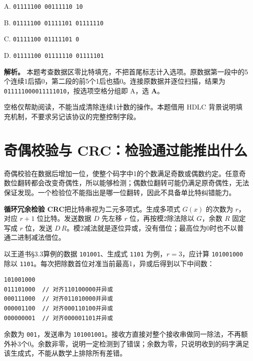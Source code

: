 A. \texttt{01111100\ 00111110\ 10}

B. \texttt{01111100\ 01111101\ 01111110}

C. \texttt{01111100\ 01111101\ 0}

D. \texttt{01111100\ 01111110\ 01111101}


\textbf{解析。} 本题考查数据区零比特填充，不把首尾标志计入选项。原数据第一段中的5个连续1后插0，第二段的前5个1后也插0。连接原数据并逐位扫描，结果为 \texttt{011111000011111010}，按选项空格分组即 A，选 \textbf{A}。

空格仅帮助阅读，不能当成清除连续1计数的操作。本题借用 HDLC 背景说明填充机制，不要求另记该协议的完整控制字段。

\section{奇偶校验与 CRC：检验通过能推出什么}\label{cn-03-03}

奇偶校验在数据后增加一位，使整个码字中1的个数满足奇数或偶数约定。任意奇数位翻转都会改变奇偶性，所以能够检测；偶数位翻转可能仍满足原奇偶性，无法保证发现。一个检验位不能指出是哪一位翻转，因此不具备单比特纠错能力。

\textbf{循环冗余检验 CRC}把比特串视为二元多项式。生成多项式 \(G(x)\) 的次数为 \(r\)，对应 \(r+1\) 位比特。发送数据 \(D\) 先左移 \(r\) 位，再按模2除法除以 \(G\)，余数 \(R\) 固定写成 \(r\) 位，发送 \(D\,R\)。模2减法就是逐位异或，没有借位；最高位为0时也不以普通二进制减法借位。

以王道书§3.3算例的数据 \texttt{101001}、生成式 \texttt{1101} 为例，\(r=3\)，应计算 \texttt{101001000} 除以 \texttt{1101}。每次把除数首位对准当前最高1，异或后得到以下中间数：

\par\medskip\noindent
\begin{minipage}{\linewidth}
\begin{verbatim}
101001000
011101000  // 对齐110100000并异或
000111000  // 对齐011010000并异或
000001100  // 对齐000110100并异或
000000001  // 对齐000001101并异或
\end{verbatim}
\end{minipage}\par\medskip

余数为 \texttt{001}，发送串为 \texttt{101001001}。接收方直接对整个接收串做同一除法，不再额外补3个0。余数非零，说明一定检测到了错误；余数为零，只说明收到的码字满足该生成式，不能从数学上排除所有差错。

